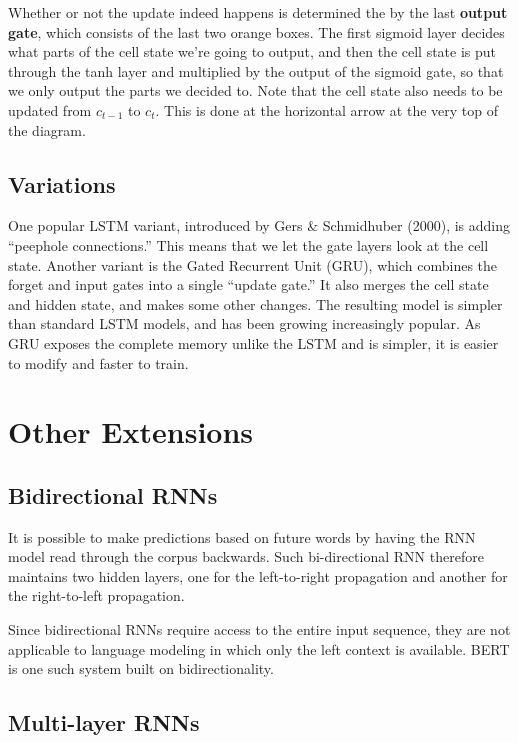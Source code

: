 \documentclass[
]{book}
\begin{document}
Whether or not the update indeed happens is determined the by the last \textbf{output gate}, which consists of the last two orange boxes. The first sigmoid layer decides what parts of the cell state we're going to output, and then the cell state is put through the tanh layer and multiplied by the output of the sigmoid gate, so that we only output the parts we decided to. Note that the cell state also needs to be updated from \(c_{t-1}\) to \(c_t\). This is done at the horizontal arrow at the very top of the diagram.

\hypertarget{variations}{%
\subsection{Variations}\label{variations}}

One popular LSTM variant, introduced by Gers \& Schmidhuber (2000), is adding ``peephole connections.'' This means that we let the gate layers look at the cell state. Another variant is the Gated Recurrent Unit (GRU), which combines the forget and input gates into a single ``update gate.'' It also merges the cell state and hidden state, and makes some other changes. The resulting model is simpler than standard LSTM models, and has been growing increasingly popular. As GRU exposes the complete memory unlike the LSTM and is simpler, it is easier to modify and faster to train.

\hypertarget{other-extensions}{%
\section{Other Extensions}\label{other-extensions}}

\hypertarget{bidirectional-rnns}{%
\subsection{Bidirectional RNNs}\label{bidirectional-rnns}}

It is possible to make predictions based on future words by having the RNN model read through the corpus backwards. Such bi-directional RNN therefore maintains two hidden layers, one for the left-to-right propagation and another for the right-to-left propagation.

Since bidirectional RNNs require access to the entire input sequence, they are not applicable to language modeling in which only the left context is available. BERT is one such system built on bidirectionality.

\hypertarget{multi-layer-rnns}{%
\subsection{Multi-layer RNNs}\label{multi-layer-rnns}}
\end{document}
